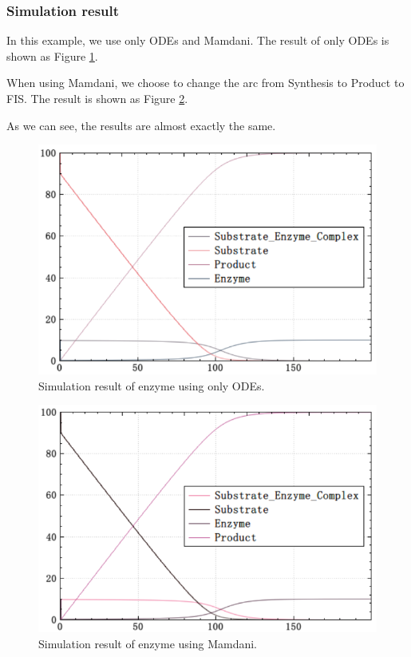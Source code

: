 \documentclass[journal,a4paper,onecolumn]{article}
\begin{document}
\subsubsection{Simulation result}
In this example, we use only ODEs and Mamdani. The result of only ODEs is shown as Figure \ref{fig:Simulation result of enzyme using only ODEs.}.

When using Mamdani, we choose to change the arc from Synthesis to Product to FIS. The result is shown as Figure \ref{fig:Simulation result of enzyme using Mamdani.}.

As we can see, the results are almost exactly the same.
\begin{figure}[!hbt]
	\begin{center}
		\includegraphics[width=\columnwidth]{fig26}
		\caption{Simulation result of enzyme using only ODEs.}
		\label{fig:Simulation result of enzyme using only ODEs.}
	\end{center}
\end{figure}
\begin{figure}[!hbt]
	\begin{center}
		\includegraphics[width=\columnwidth]{fig27}
		\caption{Simulation result of enzyme using Mamdani.}
		\label{fig:Simulation result of enzyme using Mamdani.}
	\end{center}
\end{figure}
\end{document}
